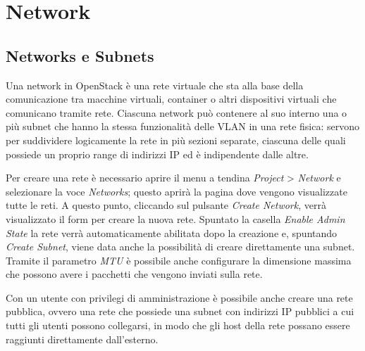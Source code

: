 \section{Network}

\subsection{Networks e Subnets}

Una network in OpenStack è una rete virtuale che sta alla base della comunicazione tra macchine virtuali, container o altri dispositivi virtuali che comunicano tramite rete.
% 
Ciascuna network può contenere al suo interno una o più subnet che hanno la stessa funzionalità delle VLAN in una rete fisica: 
% 
servono per suddividere logicamente la rete in più sezioni separate, ciascuna delle quali possiede un proprio range di indirizzi IP ed è indipendente dalle altre.

Per creare una rete è necessario aprire il menu a tendina \textit{Project} > \textit{Network} e selezionare la voce \textit{Networks}; questo aprirà la pagina dove vengono visualizzate tutte le reti. A questo punto, cliccando sul pulsante \textit{Create Network}, verrà visualizzato il form per creare la nuova rete. Spuntato la casella \textit{Enable Admin State} la rete verrà automaticamente abilitata dopo la creazione e, spuntando \textit{Create Subnet}, viene data anche la possibilità di creare direttamente una subnet. Tramite il parametro \textit{MTU} è possibile anche configurare la dimensione massima che possono avere i pacchetti che vengono inviati sulla rete.

Con un utente con privilegi di amministrazione è possibile anche creare una rete pubblica, ovvero una rete che possiede una subnet con indirizzi IP pubblici a cui tutti gli utenti possono collegarsi, in modo che gli host della rete possano essere raggiunti direttamente dall'esterno.

